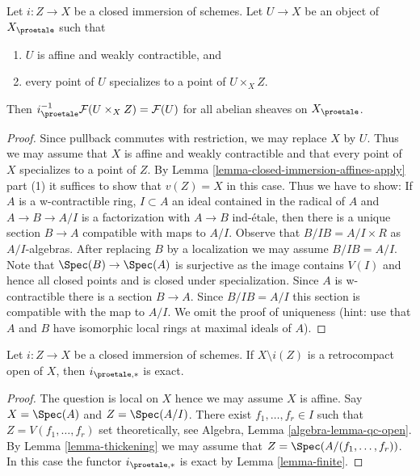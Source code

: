 \begin{lemma}
\label{lemma-compute-i-star}
Let $i : Z \to X$ be a closed immersion of schemes.
Let $U \to X$ be an object of $X_\proetale$ such that
\begin{enumerate}
\item $U$ is affine and weakly contractible, and
\item every point of $U$ specializes to a point of $U \times_X Z$.
\end{enumerate}
Then $i_\proetale^{-1}\mathcal{F}(U \times_X Z) = \mathcal{F}(U)$
for all abelian sheaves on $X_\proetale$.
\end{lemma}

\begin{proof}
Since pullback commutes with restriction, we may replace $X$ by $U$.
Thus we may assume that $X$ is affine and weakly contractible
and that every point of $X$ specializes to a point of $Z$.
By Lemma \ref{lemma-closed-immersion-affines-apply} part (1)
it suffices to show that $v(Z) = X$ in this case.
Thus we have to show: If $A$ is a w-contractible ring, $I \subset A$
an ideal contained in the radical of $A$ and $A \to B \to A/I$
is a factorization with $A \to B$ ind-\'etale, then there is
a unique section $B \to A$ compatible with maps to $A/I$.
Observe that $B/IB = A/I \times R$ as $A/I$-algebras.
After replacing $B$ by a localization we may assume $B/IB = A/I$.
Note that $\Spec(B) \to \Spec(A)$ is surjective as the image
contains $V(I)$ and hence all closed points and is closed under
specialization. Since $A$ is w-contractible there is a section $B \to A$.
Since $B/IB = A/I$ this section is compatible with the map to $A/I$.
We omit the proof of uniqueness (hint: use that $A$ and $B$ have
isomorphic local rings at maximal ideals of $A$).
\end{proof}

\begin{lemma}
\label{lemma-closed-immersion-complement-retrocompact-exact}
Let $i : Z \to X$ be a closed immersion of schemes.
If $X \setminus i(Z)$ is a retrocompact open of $X$, then
$i_{\proetale, *}$ is exact.
\end{lemma}

\begin{proof}
The question is local on $X$ hence we may assume $X$ is affine.
Say $X = \Spec(A)$ and $Z = \Spec(A/I)$. There exist
$f_1, \ldots, f_r \in I$ such that $Z = V(f_1, \ldots, f_r)$
set theoretically, see Algebra, Lemma \ref{algebra-lemma-qc-open}.
By Lemma \ref{lemma-thickening} we may assume that
$Z = \Spec(A/(f_1, \ldots, f_r))$. In this case
the functor $i_{\proetale, *}$ is exact by
Lemma \ref{lemma-finite}.
\end{proof}





